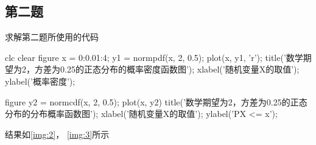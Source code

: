 \documentclass{article}
\begin{document}
\subsection{第二题}
求解第二题所使用的代码
\begin{matlabcode}

    clc
    clear
    figure
    x = 0:0.01:4;
    y1 = normpdf(x, 2, 0.5);
    plot(x, y1, 'r');
    title('数学期望为2，方差为0.25的正态分布的概率密度函数图');
    xlabel('随机变量X的取值');
    ylabel('概率密度');

    figure
    y2 = normcdf(x, 2, 0.5);
    plot(x, y2)
    title('数学期望为2，方差为0.25的正态分布的分布概率函数图');
    xlabel('随机变量X的取值');
    ylabel('P{X <= x}');

\end{matlabcode}

结果如\autoref{img:2}， \autoref{img:3}所示
\end{document}
